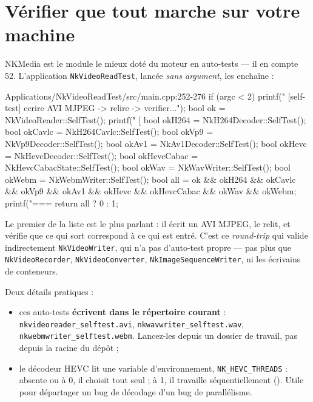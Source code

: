 \section{Vérifier que tout marche sur votre machine}

NKMedia est le module le mieux doté du moteur en auto-tests — il en compte 52.
L'application \texttt{NkVideoReadTest}, lancée \emph{sans argument}, les
enchaîne :

\begin{nkcode}{Applications/NkVideoReadTest/src/main.cpp:252-276}
    if (argc < 2) {
        printf("  [self-test] ecrire AVI MJPEG -> relire -> verifier...\n");
        bool ok = NkVideoReader::SelfTest();
        printf("  [ %
        bool okH264 = NkH264Decoder::SelfTest();
        bool okCavlc = NkH264Cavlc::SelfTest();
        bool okVp9 = NkVp9Decoder::SelfTest();
        bool okAv1 = NkAv1Decoder::SelfTest();
        bool okHevc = NkHevcDecoder::SelfTest();
        bool okHevcCabac = NkHevcCabacState::SelfTest();
        bool okWav = NkWavWriter::SelfTest();
        bool okWebm = NkWebmWriter::SelfTest();
        bool all = ok && okH264 && okCavlc && okVp9 && okAv1 && okHevc && okHevcCabac && okWav && okWebm;
        printf("=== %
        return all ? 0 : 1;
    }
\end{nkcode}

Le premier de la liste est le plus parlant : il écrit un AVI MJPEG, le relit, et
vérifie que ce qui sort correspond à ce qui est entré. C'est ce
\emph{round-trip} qui valide indirectement \texttt{NkVideoWriter}, qui n'a pas
d'auto-test propre — pas plus que \texttt{NkVideoRecorder},
\texttt{NkVideoConverter}, \texttt{NkImageSequenceWriter}, ni les écrivains de
conteneurs.

Deux détails pratiques :

\begin{itemize}
  \item ces auto-tests \textbf{écrivent dans le répertoire courant} :
        \texttt{nkvideoreader\_selftest.avi},
        \texttt{nkwavwriter\_selftest.wav},
        \texttt{nkwebmwriter\_selftest.webm}. Lancez-les depuis un dossier de
        travail, pas depuis la racine du dépôt ;
  \item le décodeur HEVC lit une variable d'environnement,
        \texttt{NK\_HEVC\_THREADS} : absente ou à 0, il choisit tout seul ; à 1,
        il travaille séquentiellement ().
        Utile pour départager un bug de décodage d'un bug de parallélisme.
\end{itemize}


